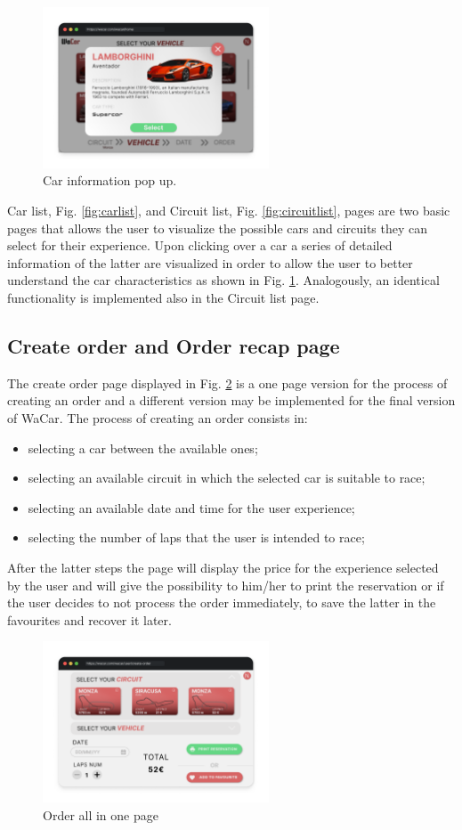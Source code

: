 \begin{figure}[!h]
    \centering
    \includegraphics[width=0.6\textwidth]{mockup/InfoCar.png}
    \caption{Car information pop up.}
    \label{fig:infocar}
\end{figure}

Car list, Fig. \ref{fig:carlist}, and Circuit list, Fig. \ref{fig:circuitlist}, pages are two basic pages that allows the user to visualize the possible cars and circuits they can select for their experience. Upon clicking over a car a series of detailed information of the latter are visualized in order to allow the user to better understand the car characteristics as shown in Fig. \ref{fig:infocar}. Analogously, an identical functionality is implemented also in the Circuit list page.

\subsection{Create order and Order recap page}

The create order page displayed in Fig. \ref{fig:allinone} is a one page version for the process of creating an order and a different version may be implemented for the final version of WaCar. The process of creating an order consists in:

\begin{itemize}
    \item selecting a car between the available ones;
    \item selecting an available circuit in which the selected car is suitable to race;
    \item selecting an available date and time for the user experience;
    \item selecting the number of laps that the user is intended to race;
\end{itemize}

After the latter steps the page will display the price for the experience selected by the user and will give the possibility to him/her to print the reservation or if the user decides to not process the order immediately, to save the latter in the favourites and recover it later.

\begin{figure}[h]
    \centering
    \includegraphics[width=0.6\textwidth]{mockup/OrderAllInOne.png}
    \caption{Order all in one page}
    \label{fig:allinone}
\end{figure}